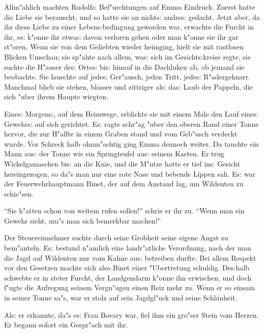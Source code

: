 \documentclass[oneside,12pt]{book}
\newcommand{\s}{s:}%
\begin{document}
\newpage\begin{center}
{\large \so{Zehnte{\s} Kapitel}}\bigskip\bigskip
\end{center}

Allm"ahlich machten Rudolf{\s} Bef"urchtungen auf Emma Eindruck.
Zuerst hatte die Liebe sie berauscht, und so hatte sie an
nicht{\s} andre{\s} gedacht. Jetzt aber, da ihr diese Liebe zu
einer Leben{\s}bedingung geworden war, erwachte die Furcht in ihr,
e{\s} k"onne ihr etwa{\s} davon verloren gehen oder man k"onne sie
ihr gar st"oren. Wenn sie von dem Geliebten wieder heimging, hielt
sie mit rastlosen Blicken Umschau; sie sp"ahte nach allem, wa{\s}
sich im Gesicht{\s}kreise regte, sie suchte die H"auser de{\s}
Orte{\s} bi{\s} hinauf in die Dachluken ab, ob jemand sie
beobachte. Sie lauschte auf jede{\s} Ger"ausch, jeden Tritt,
jede{\s} R"adergeknarr. Manchmal blieb sie stehen, blasser und
zittriger al{\s} da{\s} Laub der Pappeln, die sich "uber ihrem
Haupte wiegten.

Eine{\s} Morgen{\s}, auf dem Heimwege, erblickte sie mit einem
Male den Lauf eine{\s} Gewehr{\s} auf sich gerichtet. E{\s} ragte
schr"ag "uber den oberen Rand einer Tonne hervor, die zur H"alfte
in einem Graben stand und vom Geb"usch verdeckt wurde. Vor Schreck
halb ohnm"achtig ging Emma dennoch weiter. Da tauchte ein Mann
au{\s} der Tonne wie ein Springteufel au{\s} seinem Kasten. Er
trug Wickelgamaschen bi{\s} an die Knie, und die M"utze hatte er
tief in{\s} Gesicht hereingezogen, so da"s man nur eine rote Nase
und bebende Lippen sah. E{\s} war der Feuerwehrhauptmann Binet,
der auf dem Anstand lag, um Wildenten zu schie"sen.

"`Sie h"atten schon von weitem rufen sollen!"' schrie er ihr zu.
"`Wenn man ein Gewehr sieht, mu"s man sich bemerkbar machen!"'

Der Steuereinnehmer suchte durch seine Grobheit seine eigene Angst
zu bem"anteln. E{\s} bestand n"amlich eine landr"atliche
Verordnung, nach der man die Jagd auf Wildenten nur vom Kahne
au{\s} betreiben durfte. Bei allem Respekt vor den Gesetzen machte
sich also Binet einer "Ubertretung schuldig. De{\s}halb schwebte
er in steter Furcht, der Landgendarm k"onne ihn erwischen, und
doch f"ugte die Aufregung seinem Vergn"ugen einen Reiz mehr zu.
Wenn er so einsam in seiner Tonne sa"s, war er stolz auf sein
Jagdgl"uck und seine Schlauheit.

Al{\s} er erkannte, da"s e{\s} Frau Bovary war, fiel ihm ein
gro"ser Stein vom Herzen. Er begann sofort ein Gespr"ach mit ihr.
\end{document}
